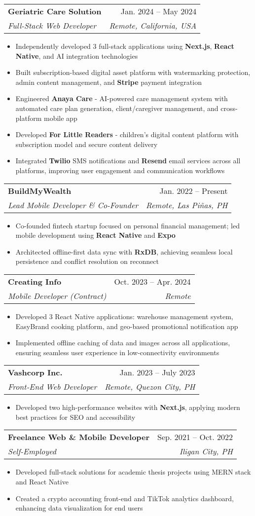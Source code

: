 \documentclass[letterpaper,11pt]{article}
\makeatletter
\newcommand{\resumeItem}[1]{
  \item\small{
    {#1 \vspace{-2pt}}
  }
}
\newcommand{\resumeSubheading}[4]{
  \vspace{-2pt}\item
    \begin{tabular*}{0.97\textwidth}[t]{l@{\extracolsep{\fill}}r}
      \textbf{#1} & #2 \\
      \textit{\small#3} & \textit{\small #4} \\
    \end{tabular*}\vspace{-7pt}
}
\newcommand{\resumeItemListStart}{\begin{itemize}}
\newcommand{\resumeItemListEnd}{\end{itemize}\vspace{-5pt}}
\makeatother
\begin{document}
    \resumeSubheading
      {Geriatric Care Solution}{Jan. 2024 -- May 2024}
      {Full-Stack Web Developer}{Remote, California, USA}
      \resumeItemListStart
        \resumeItem{Independently developed 3 full-stack applications using \textbf{Next.js}, \textbf{React Native}, and AI integration technologies}
        \resumeItem{Built subscription-based digital asset platform with watermarking protection, admin content management, and \textbf{Stripe} payment integration}
        \resumeItem{Engineered \textbf{Anaya Care} - AI-powered care management system with automated care plan generation, client/caregiver management, and cross-platform mobile app}
        \resumeItem{Developed \textbf{For Little Readers} - children's digital content platform with subscription model and secure content delivery}
        \resumeItem{Integrated \textbf{Twilio} SMS notifications and \textbf{Resend} email services across all platforms, improving user engagement and communication workflows}
      \resumeItemListEnd

    \resumeSubheading
      {BuildMyWealth}{Jan. 2022 -- Present}
      {Lead Mobile Developer \& Co-Founder}{Remote, Las Piñas, PH}
      \resumeItemListStart
        \resumeItem{Co-founded fintech startup focused on personal financial management; led mobile development using \textbf{React Native} and \textbf{Expo}}
        \resumeItem{Architected offline-first data sync with \textbf{RxDB}, achieving seamless local persistence and conflict resolution on reconnect}
      \resumeItemListEnd

    \resumeSubheading
      {Creating Info}{Oct. 2023 -- Apr. 2024}
      {Mobile Developer (Contract)}{Remote}
      \resumeItemListStart
        \resumeItem{Developed 3 React Native applications: warehouse management system, EasyBrand cooking platform, and geo-based promotional notification app}
        \resumeItem{Implemented offline caching of data and images across all applications, ensuring seamless user experience in low-connectivity environments}
      \resumeItemListEnd

    \resumeSubheading
      {Vashcorp Inc.}{Jan. 2023 -- July 2023}
      {Front-End Web Developer}{Remote, Quezon City, PH}
      \resumeItemListStart
        \resumeItem{Developed two high-performance websites with \textbf{Next.js}, applying modern best practices for SEO and accessibility}
      \resumeItemListEnd

    \resumeSubheading
      {Freelance Web \& Mobile Developer}{Sep. 2021 -- Oct. 2022}
      {Self-Employed}{Iligan City, PH}
      \resumeItemListStart
        \resumeItem{Developed full-stack solutions for academic thesis projects using MERN stack and React Native}
        \resumeItem{Created a crypto accounting front-end and TikTok analytics dashboard, enhancing data visualization for end users}
      \resumeItemListEnd
\end{document}
